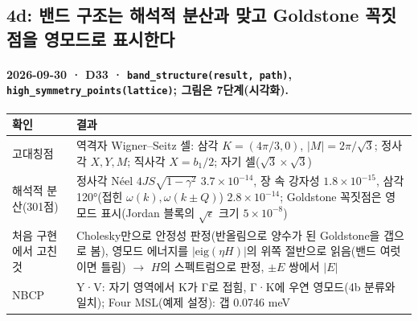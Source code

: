 \subsection{4d: 밴드 구조는 해석적 분산과 맞고 Goldstone 꼭짓점을 영모드로 표시한다}\label{stage4d}
\begingroup%
  \framesubtitle{2026-09-30 · D33 · \texttt{band\_structure(result, path)}, \texttt{high\_symmetry\_points(lattice)}; 그림은 7단계(시각화).}
  \footnotesize\renewcommand{\arraystretch}{1.08}
  \begin{tabularx}{\textwidth}{@{}P{3.3cm}Y@{}}
    \toprule
    확인 & 결과 \\
    \midrule
    고대칭점 & 역격자 Wigner--Seitz 셀: 삼각 $K=(4\pi/3,0)$, $|M|=2\pi/\sqrt3$; 정사각 $X,Y,M$; 직사각 $X=b_1/2$; 자기 셀($\sqrt3\times\sqrt3$) \\
    해석적 분산(301점) & 정사각 Néel $4JS\sqrt{1-\gamma^2}$ $3.7\times10^{-14}$, 장 속 강자성 $1.8\times10^{-15}$, 삼각 120°(접힌 $\omega(k),\omega(k\pm Q)$) $2.8\times10^{-14}$; Goldstone 꼭짓점은 영모드 표시(Jordan 블록의 $\sqrt\epsilon$ 크기 $5\times10^{-8}$) \\
    처음 구현에서 고친 것 & Cholesky만으로 안정성 판정(반올림으로 양수가 된 Goldstone을 갭으로 봄), 영모드 에너지를 $|\mathrm{eig}(\eta H)|$의 위쪽 절반으로 읽음(밴드 여럿이면 틀림) $\to$ $H$의 스펙트럼으로 판정, $\pm E$ 쌍에서 $|E|$ \\
    NBCP & Y·V: 자기 영역에서 K가 Γ로 접힘, Γ·K에 우연 영모드(4b 분류와 일치); Four MSL(예제 설정): 갭 0.0746 meV \\
    \bottomrule
  \end{tabularx}
  \par\smallskip
\endgroup


